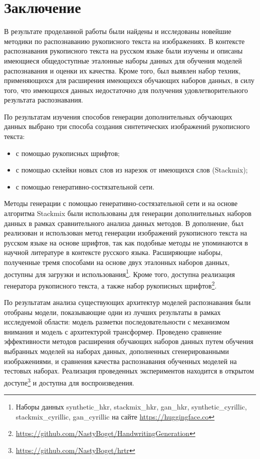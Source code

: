 \section{Заключение}
\label{sec:Chapter5} 

В результате проделанной работы были найдены и исследованы новейшие методики по распознаванию рукописного текста на изображениях.
В контексте распознавания рукописного текста на русском языке были изучены и описаны имеющиеся общедоступные эталонные наборы данных
для обучения моделей распознавания и оценки их качества.
Кроме того, был выявлен набор техник, применяющихся для расширения имеющихся обучающих наборов данных,
в силу того, что имеющихся данных недостаточно для получения удовлетворительного результата распознавания.

По результатам изучения способов генерации дополнительных обучающих данных выбрано три способа создания синтетических изображений рукописного текста:
\begin{itemize}
    \item с помощью рукописных шрифтов;
    \item с помощью склейки новых слов из нарезок от имеющихся слов (Stackmix);
    \item с помощью генеративно-состязательной сети.
\end{itemize}

Методы генерации с помощью генеративно-состязательной сети и на основе алгоритма Stackmix были использованы для генерации
дополнительных наборов данных в рамках сравнительного анализа данных методов.
В дополнение, был реализован и использован метод генерации изображений рукописного текста на русском языке на основе шрифтов,
так как подобные методы не упоминаются в научной литературе в контексте русского языка.
Расширяющие наборы, полученные тремя способами на основе двух эталонных наборов данных, доступны для загрузки
и использования\footnote{Наборы данных synthetic\_hkr, stackmix\_hkr, gan\_hkr, synthetic\_cyrillic, stackmix\_cyrillic, gan\_cyrillic на сайте \url{https://huggingface.co}}.
Кроме того, доступна реализация генератора рукописного текста, а также набор рукописных шрифтов\footnote{\url{https://github.com/NastyBoget/HandwritingGeneration}}.

По результатам анализа существующих архитектур моделей распознавания были отобраны модели, показывающие одни из лучших
результаты в рамках исследуемой области: модель разметки последовательности с механизмом внимания и модель с архитектурой трансформер.
Проведено сравнение эффективности методов расширения обучающих наборов данных путем обучения выбранных моделей
на наборах данных, дополненных сгенерированными изображениями, и сравнения качества распознавания обученных моделей на тестовых наборах.
Реализация проведенных экспериментов находится в открытом доступе\footnote{\url{https://github.com/NastyBoget/hrtr}} и доступна для воспроизведения.

